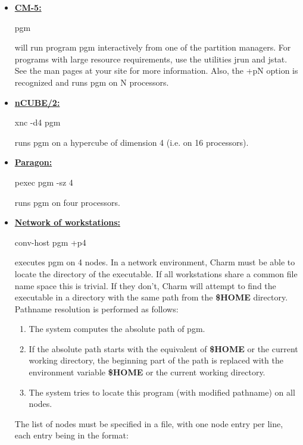\begin{itemize}

\item \underline{\bf CM-5:} 
	\begin{tabbing}
	{\fexec pgm}
	\end{tabbing}
	will run program {\fparm pgm} interactively from one of the partition 
	managers.  For programs with large resource requirements, use the utilities
	{\fexec jrun} and {\fexec jstat}. See the man pages at your site for
	more information. Also, the {\fexec +pN} option is recognized and runs {\fexec pgm} on {\fexec N} processors.

\item \underline{\bf nCUBE/2:} 
	\begin{tabbing}
	{\fexec xnc -d4 pgm}
	\end{tabbing}
	runs {\fparm pgm} on a hypercube of dimension 4 (i.e. on 16 processors). 

\item \underline{\bf Paragon:} 
	\begin{tabbing}
	{\fexec pexec pgm -sz 4}
	\end{tabbing}
	runs {\fparm pgm} on four processors.

\item \underline{\bf Network of workstations:} 
	\begin{tabbing}
	{\fexec conv-host pgm +p4}
	\end{tabbing}
	executes {\fparm pgm} on 4 nodes.  In a network environment, Charm must
	be able to locate the directory of the executable.  If all workstations
	share a common file name space this is trivial.  If they don't, Charm
	will attempt to find the executable in a directory with the same path
	from the {\bf \$HOME} directory.  Pathname resolution is performed as 
	follows:
	\begin{enumerate}
		\item The system computes the absolute path of {\fexec pgm}.
		\item If the absolute path starts with the equivalent of {\bf \$HOME} 
			or the current working directory, the beginning part of the path 
			is replaced with the environment variable {\bf \$HOME} or the 
			current working directory.
		\item The system tries to locate this program (with modified 
			pathname) on all nodes.
	\end{enumerate}

The list of nodes must be specified in a file, with one node entry per
line, each entry being in the format:


\end{itemize}
